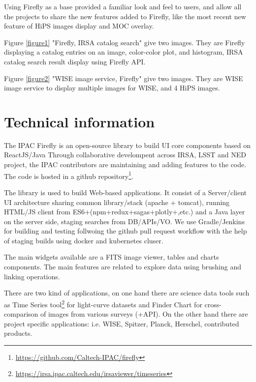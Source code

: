 \documentclass[11pt,twoside]{article}
\begin{document}
Using Firefly as a base provided a familiar look and feel to users, and allow all the projects to share the new features added to Firefly, like the most recent new feature of HiPS images display and MOC overlay.

Figure \ref{figure1} "Firefly, IRSA catalog search" give two images. They are Firefly displaying a catalog entries on an image, color-color plot, and histogram,
IRSA catalog search result display using Firefly API.

Figure \ref{figure2} "WISE image service, Firefly" give two images. They are WISE image service to display multiple images for WISE, and 4 HiPS images.


\smallskip
\smallskip

\section{Technical information}

The IPAC Firefly is an open-source library to build UI core components based on ReactJS/Java Through collaborative develompent across IRSA, LSST and NED project, the IPAC contributors are maintaining and adding features to the code.
The code is hosted in a github repository\footnote{\url{https://github.com/Caltech-IPAC/firefly}}.

The library is used to build Web-based applications. It consist of a Server/client UI architecture sharing common library/stack (apache + tomcat), running HTML/JS client from ES6+(npm+redux+sagas+plotly+,etc.) and a Java layer on the server side, staging searches from DB/APIs/VO. We use Gradle/Jenkins for building and testing follwoing the github pull request workflow with the help of staging builds using docker and kubernetes cluser.

The main widgets available are a FITS image viewer, tables and charts components. The main features are related to explore data using brushing and linking operations.

There are two kind of applications, on one hand there are science data tools such as Time Series tool\footnote{\url{https://irsa.ipac.caltech.edu/irsaviewer/timeseries}} for light-curve datasets and Finder Chart for cross-comparison of images from various surveys (+API).
On the other hand there are project specific applications: i.e. WISE, Spitzer, Planck, Herschel, contributed products.
\end{document}
